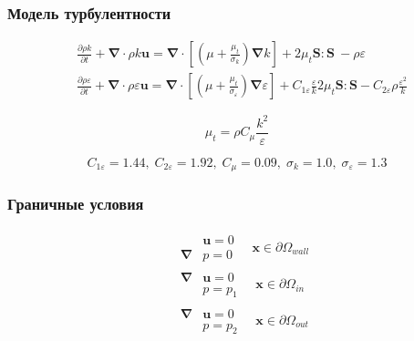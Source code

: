 \documentclass[10pt,xcolor={dvipsnames,table},aspectratio=169]{beamer}
\begin{document}
    \begin{frame}{}

        \justifying
        \normalsize

        \frametitle{Модель турбулентности}

        \[
            \begin{aligned}
                &\frac{\partial \rho k}{\partial t}
                + \symbf{\nabla} \cdot \rho k \symbf{u}
                =
                \symbf{\nabla} \cdot \left[ \left(\mu + \frac{\mu_{t}}{\sigma_k} \right) \symbf{\nabla} k \right]
                + 2 \mu_{t} \symbf{S} \colon \symbf{S} \ - \rho \varepsilon  \\
                &\frac{\partial \rho \varepsilon}{\partial t}
                + \symbf{\nabla} \cdot \rho \varepsilon \symbf{u}
                =
                \symbf{\nabla} \cdot \left[\left(\mu + \frac{\mu_{t}}{\sigma_{\varepsilon}} \right) \symbf{\nabla} \varepsilon \right]
                + C_{1 \varepsilon} \frac{\varepsilon}{k} 2 \mu_{t} \symbf{S} \colon \symbf{S} - C_{2 \varepsilon} \rho \frac{\varepsilon^2}{k}
            \end{aligned}
        \]

        \[
            \mu_{t} = \rho C_{\mu} \frac{k^{2}}{\varepsilon}
        \]

        \[
            C_{1 \varepsilon} = 1.44, \; C_{2 \varepsilon} = 1.92, \; C_{\mu} = 0.09, \; \sigma_{k} = 1.0, \; \sigma_{\varepsilon} = 1.3
        \]

    \end{frame}{}

    \begin{frame}{}

        \justifying
        \normalsize

        \frametitle{Граничные условия}

        \[
            \begin{aligned}
                &\begin{aligned}
                    &\symbf{u} = 0 \\
                    \symbf{\nabla} &p = 0
                \end{aligned} \quad \symbf{x} \in \partial \Omega_{wall} \\
                &\begin{aligned}
                    \symbf{\nabla} &\symbf{u} = 0 \\
                    &p = p_{1}
                \end{aligned} \quad \symbf{x} \in \partial \Omega_{in} \\
                &\begin{aligned}
                    \symbf{\nabla} &\symbf{u} = 0 \\
                    &p = p_{2}
                \end{aligned} \quad \symbf{x} \in \partial \Omega_{out}
            \end{aligned}
        \]

    \end{frame}{}
\end{document}
